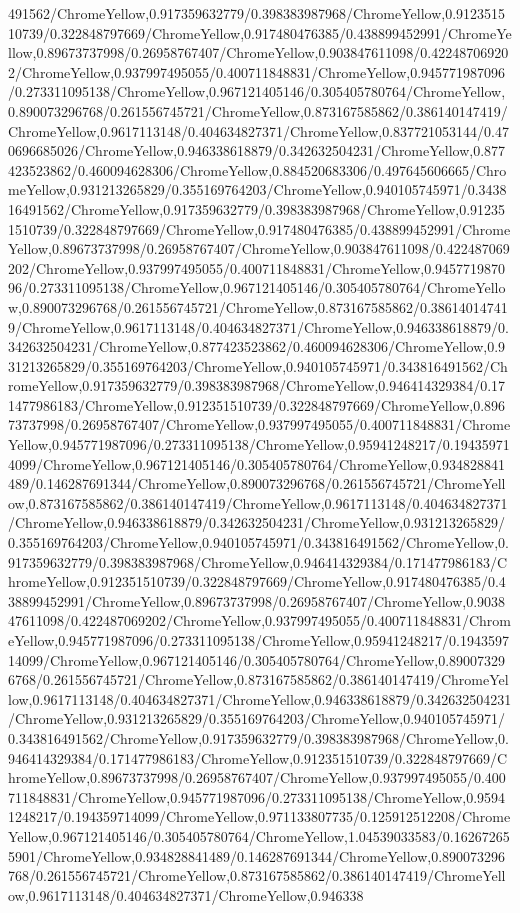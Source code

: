{\begin{tikzternal}
{491562/ChromeYellow,0.917359632779/0.398383987968/ChromeYellow,0.912351510739/0.322848797669/ChromeYellow,0.917480476385/0.438899452991/ChromeYellow,0.89673737998/0.26958767407/ChromeYellow,0.903847611098/0.422487069202/ChromeYellow,0.937997495055/0.400711848831/ChromeYellow,0.945771987096/0.273311095138/ChromeYellow,0.967121405146/0.305405780764/ChromeYellow,0.890073296768/0.261556745721/ChromeYellow,0.873167585862/0.386140147419/ChromeYellow,0.9617113148/0.404634827371/ChromeYellow,0.837721053144/0.470696685026/ChromeYellow,0.946338618879/0.342632504231/ChromeYellow,0.877423523862/0.460094628306/ChromeYellow,0.884520683306/0.497645606665/ChromeYellow,0.931213265829/0.355169764203/ChromeYellow,0.940105745971/0.343816491562/ChromeYellow,0.917359632779/0.398383987968/ChromeYellow,0.912351510739/0.322848797669/ChromeYellow,0.917480476385/0.438899452991/ChromeYellow,0.89673737998/0.26958767407/ChromeYellow,0.903847611098/0.422487069202/ChromeYellow,0.937997495055/0.400711848831/ChromeYellow,0.945771987096/0.273311095138/ChromeYellow,0.967121405146/0.305405780764/ChromeYellow,0.890073296768/0.261556745721/ChromeYellow,0.873167585862/0.386140147419/ChromeYellow,0.9617113148/0.404634827371/ChromeYellow,0.946338618879/0.342632504231/ChromeYellow,0.877423523862/0.460094628306/ChromeYellow,0.931213265829/0.355169764203/ChromeYellow,0.940105745971/0.343816491562/ChromeYellow,0.917359632779/0.398383987968/ChromeYellow,0.946414329384/0.171477986183/ChromeYellow,0.912351510739/0.322848797669/ChromeYellow,0.89673737998/0.26958767407/ChromeYellow,0.937997495055/0.400711848831/ChromeYellow,0.945771987096/0.273311095138/ChromeYellow,0.95941248217/0.194359714099/ChromeYellow,0.967121405146/0.305405780764/ChromeYellow,0.934828841489/0.146287691344/ChromeYellow,0.890073296768/0.261556745721/ChromeYellow,0.873167585862/0.386140147419/ChromeYellow,0.9617113148/0.404634827371/ChromeYellow,0.946338618879/0.342632504231/ChromeYellow,0.931213265829/0.355169764203/ChromeYellow,0.940105745971/0.343816491562/ChromeYellow,0.917359632779/0.398383987968/ChromeYellow,0.946414329384/0.171477986183/ChromeYellow,0.912351510739/0.322848797669/ChromeYellow,0.917480476385/0.438899452991/ChromeYellow,0.89673737998/0.26958767407/ChromeYellow,0.903847611098/0.422487069202/ChromeYellow,0.937997495055/0.400711848831/ChromeYellow,0.945771987096/0.273311095138/ChromeYellow,0.95941248217/0.194359714099/ChromeYellow,0.967121405146/0.305405780764/ChromeYellow,0.890073296768/0.261556745721/ChromeYellow,0.873167585862/0.386140147419/ChromeYellow,0.9617113148/0.404634827371/ChromeYellow,0.946338618879/0.342632504231/ChromeYellow,0.931213265829/0.355169764203/ChromeYellow,0.940105745971/0.343816491562/ChromeYellow,0.917359632779/0.398383987968/ChromeYellow,0.946414329384/0.171477986183/ChromeYellow,0.912351510739/0.322848797669/ChromeYellow,0.89673737998/0.26958767407/ChromeYellow,0.937997495055/0.400711848831/ChromeYellow,0.945771987096/0.273311095138/ChromeYellow,0.95941248217/0.194359714099/ChromeYellow,0.971133807735/0.125912512208/ChromeYellow,0.967121405146/0.305405780764/ChromeYellow,1.04539033583/0.162672655901/ChromeYellow,0.934828841489/0.146287691344/ChromeYellow,0.890073296768/0.261556745721/ChromeYellow,0.873167585862/0.386140147419/ChromeYellow,0.9617113148/0.404634827371/ChromeYellow,0.946338}
\end{tikzternal}}
